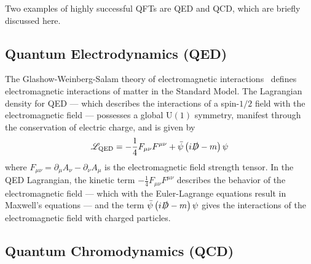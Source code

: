 Two examples of highly successful \glspl{QFT} are \gls{QED} and \gls{QCD}, which are briefly discussed here.

\subsection{Quantum Electrodynamics (QED)}\label{subsection:QED}

The Glashow-Weinberg-Salam theory of electromagnetic interactions~\cite{Glashow:1961tr,Goldstone:1962es,Weinberg:1967tq} defines electromagnetic interactions of matter in the Standard Model.
The Lagrangian density for QED --- which describes the interactions of a spin-$1/2$ field with the electromagnetic field --- possesses a global $\mathrm{U}(1)$ symmetry, manifest through the conservation of electric charge, and is given by
\begin{equation}
 \mathscr{L}_{\textrm{QED}} = -\frac{1}{4}F_{\mu\nu} F^{\mu\nu} + \bar{\psi} \left(i \slashed{D} - m\right)\psi
 \label{eq:QED_Lagrangian}
\end{equation}
where $F_{\mu\nu} = \partial_{\mu}A_{\nu} - \partial_{\nu}A_{\mu}$ is the electromagnetic field strength tensor.
In the QED Lagrangian, the kinetic term $-\frac{1}{4}F_{\mu\nu} F^{\mu\nu}$ describes the behavior of the electromagnetic field --- which with the Euler-Lagrange equations result in Maxwell's equations --- and the term $\bar{\psi} \left(i \slashed{D} - m\right)\psi$ gives the interactions of the electromagnetic field with charged particles.

\subsection{Quantum Chromodynamics (QCD)}\label{subsection:QCD}

